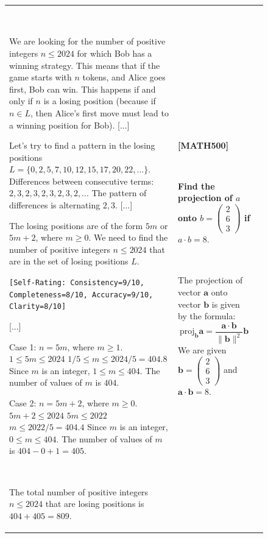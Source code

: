 \documentclass{article}
\theoremstyle{plain}
\theoremstyle{definition}
\theoremstyle{remark}
\begin{document}
\begin{figure}[p]
\begin{tabular}{@{}p{}p{}p{}@{}}
~

\textcolor{defaultlightblue}{
We are looking for the number of positive integers $n \le 2024$ for which Bob has a winning strategy. This means that if the game starts with $n$ tokens, and Alice goes first, Bob can win. This happens if and only if $n$ is a losing position (because if $n \in L$, then Alice's first move must lead to a winning position for Bob). \textcolor[HTML]{808080}{[...]}
}

\textcolor{defaultlightblue}{
Let's try to find a pattern in the losing positions $L = \{0, 2, 5, 7, 10, 12, 15, 17, 20, 22, ...\}$.
Differences between consecutive terms: $2, 3, 2, 3, 2, 3, 2, 3, 2, ...$
The pattern of differences is alternating $2, 3$. \textcolor[HTML]{808080}{[...]}
}

\textcolor{defaultlightblue}{
The losing positions are of the form $5m$ or $5m+2$, where $m \ge 0$.
We need to find the number of positive integers $n \le 2024$ that are in the set of losing positions $L$.}

\texttt{\small [Self-Rating: Consistency=9/10, Completeness=8/10, Accuracy=9/10, Clarity=8/10]}

\textcolor{defaultlightblue}{\textcolor[HTML]{808080}{[...]}
}

\textcolor{defaultlightblue}{
Case 1: $n = 5m$, where $m \ge 1$.
$1 \le 5m \le 2024$
$1/5 \le m \le 2024/5 = 404.8$
Since $m$ is an integer, $1 \le m \le 404$.
The number of values of $m$ is $404$. 
}

\textcolor{defaultlightblue}{
Case 2: $n = 5m+2$, where $m \ge 0$.
$5m+2 \le 2024$
$5m \le 2022$
$m \le 2022/5 = 404.4$
Since $m$ is an integer, $0 \le m \le 404$.
The number of values of $m$ is $404 - 0 + 1 = 405$.
}

~

\textcolor{defaultblue}{
The total number of positive integers $n \le 2024$ that are losing positions is $404 + 405 = \boxed{809}$.
}


&
\textbf{[MATH500]}

~

\textbf{
Find the projection of $a$ onto $b = \begin{pmatrix} 2 \\ 6 \\ 3 \end{pmatrix}$ if $a \cdot b = 8.$
}

~ 

\textcolor{defaultlightblue}{
The projection of vector $\mathbf{a}$ onto vector $\mathbf{b}$ is given by the formula:
$$\text{proj}_{\mathbf{b}} \mathbf{a} = \frac{\mathbf{a} \cdot \mathbf{b}}{\|\mathbf{b}\|^2} \mathbf{b}$$
We are given $\mathbf{b} = \begin{pmatrix} 2 \\ 6 \\ 3 \end{pmatrix}$ and $\mathbf{a} \cdot \mathbf{b} = 8.$
}


\end{tabular}
\end{figure}
\end{document}
